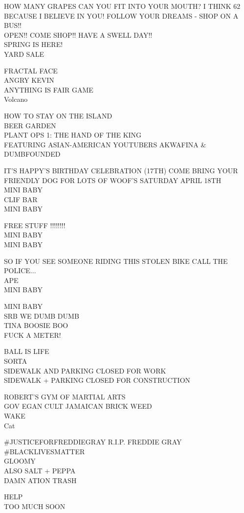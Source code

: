 \documentclass[10pt,letterpaper]{article}
\begin{document}
HOW MANY GRAPES CAN YOU FIT INTO YOUR MOUTH?  I THINK 62 BECAUSE I BELIEVE IN YOU!  FOLLOW YOUR DREAMS {-} SHOP ON A BUS!!\\
OPEN!! COME SHOP!! HAVE A SWELL DAY!!\\
SPRING IS HERE!\\
YARD SALE

FRACTAL FACE\\
ANGRY KEVIN\\
ANYTHING IS FAIR GAME\\
Volcano

HOW TO STAY ON THE ISLAND\\
BEER GARDEN\\
PLANT OPS 1: THE HAND OF THE KING\\
FEATURING ASIAN{-}AMERICAN YOUTUBERS AKWAFINA \& DUMBFOUNDED

IT'S HAPPY'S BIRTHDAY CELEBRATION (17TH) COME BRING YOUR FRIENDLY DOG FOR LOTS OF WOOF'S SATURDAY APRIL 18TH\\
MINI BABY\\
CLIF BAR\\
MINI BABY

FREE STUFF !!!!!!!!\\
MINI BABY\\
MINI BABY

SO IF YOU SEE SOMEONE RIDING THIS STOLEN BIKE CALL THE POLICE...\\
APE\\
MINI BABY

MINI BABY\\
SRB WE DUMB DUMB\\
TINA BOOSIE BOO\\
FUCK A METER!

BALL IS LIFE\\
SORTA\\
SIDEWALK AND PARKING CLOSED FOR WORK\\
SIDEWALK + PARKING CLOSED FOR CONSTRUCTION

ROBERT'S GYM OF MARTIAL ARTS\\
GOV EGAN CULT JAMAICAN BRICK WEED\\
WAKE\\
Cat

\#JUSTICEFORFREDDIEGRAY R.I.P. FREDDIE GRAY \#BLACKLIVESMATTER\\
GLOOMY\\
ALSO SALT + PEPPA\\
DAMN ATION TRASH

HELP\\
TOO MUCH SOON
\end{document}
